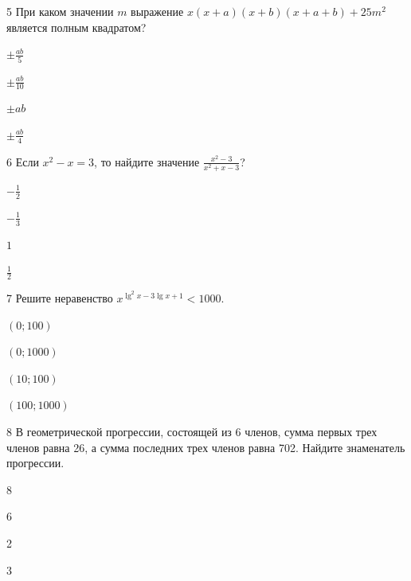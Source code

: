 \documentclass[14pt]{article}
\begin{document}
\begin{questionbox}{5}
    При каком значении \(m\) выражение \(x(x + a)(x + b)(x + a + b) + 25m^2\) является полным квадратом?
    \begin{options}
        \item \(\pm \frac{ab}{5}\)
        \item \(\pm \frac{ab}{10}\)
        \item \(\pm ab\)
        \item \(\pm \frac{ab}{4}\)
    \end{options}
\end{questionbox}

\begin{questionbox}{6}
    Если \(x^2 - x = 3\), то найдите значение \(\frac{x^2 -3}{x^2+x-3}\)? 
    \begin{options}
        \item \(-\frac{1}{2}\)
        \item \(-\frac{1}{3}\)
        \item \(1\)
        \item \(\frac{1}{2}\)
    \end{options}
\end{questionbox}

\begin{questionbox}{7}
    Решите неравенство \(x^{\lg^2 x - 3\lg x + 1} < 1000\).
    \begin{options}
        \item \((0; 100)\)
        \item \((0; 1000)\)
        \item \((10; 100)\)
        \item \((100; 1000)\)
    \end{options}
\end{questionbox}

\begin{questionbox}{8}
    В геометрической прогрессии, состоящей из 6 членов, сумма первых трех членов равна 26, а сумма последних трех членов равна 702. Найдите знаменатель прогрессии.
    \begin{options}
        \item 8
        \item 6
        \item 2
        \item 3
    \end{options}
\end{questionbox}
\end{document}
